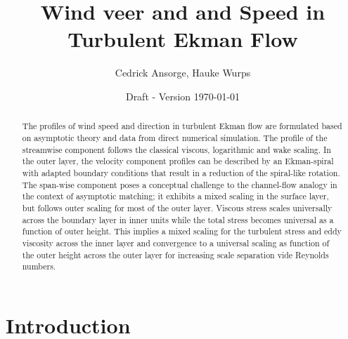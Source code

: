 \documentclass[a4paper,11pt]{amsart}
\date{\scriptsize Draft - Version \today}
\title{Wind veer and and Speed in Turbulent Ekman Flow}
\author{Cedrick Ansorge, Hauke Wurps}
\begin{document}
 

\maketitle

\begin{abstract}
  The profiles of wind speed and direction in turbulent Ekman flow
  are formulated based on asymptotic theory and data from direct numerical simulation. 
  The profile of the streamwise component follows the classical viscous, logarithmic and wake scaling.
  In the outer layer, the velocity component profiles can be described by an Ekman-spiral with adapted
  boundary conditions that result in a reduction of the spiral-like rotation. 
  The span-wise component poses a conceptual challenge to the channel-flow analogy
  in the context of asymptotic matching; it exhibits a mixed scaling in the surface layer, but follows
  outer scaling for most of the outer layer.
  Viscous stress scales universally across the boundary layer in inner units while the total stress
  becomes universal as a function of outer height.
  This implies a mixed scaling for the turbulent stress and eddy viscosity across the inner layer
  and convergence to a universal scaling as function of the outer height across the outer layer
  for increasing scale separation vide Reynolds numbers. 
\end{abstract}
%
%
\section{Introduction}
\end{document}
